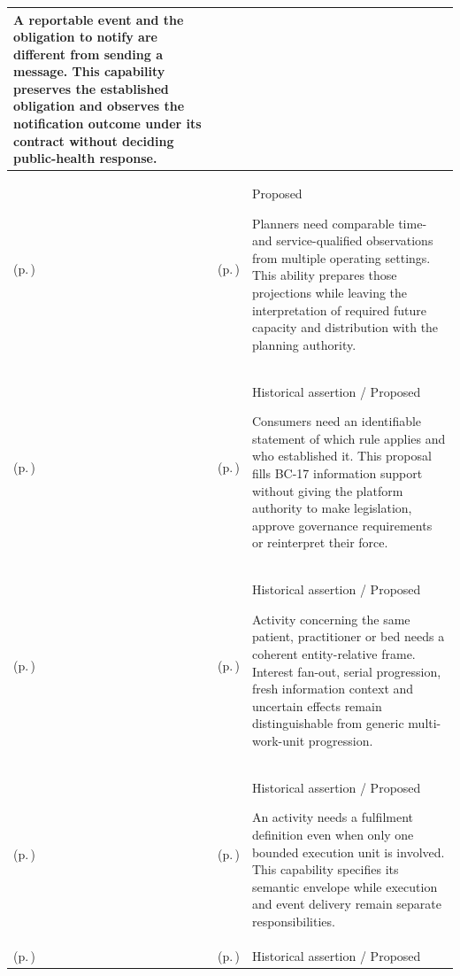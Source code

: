 \begin{longtable}{|>{\raggedright\arraybackslash}p{0.27\TableWidth}|>{\raggedright\arraybackslash}p{0.27\TableWidth}|>{\raggedright\arraybackslash}p{0.46\TableWidth}|}
A reportable event and the obligation to notify are different from sending a message. This capability preserves the established obligation and observes the notification outcome under its contract without deciding public-health response.\\\hline
\nameref{cap:bec-secondary-health-information-use-enablement} (p.\,\pageref{cap:bec-secondary-health-information-use-enablement}) & \nameref{cap:bec-service-planning-information-provision} (p.\,\pageref{cap:bec-service-planning-information-provision}) & Proposed

Planners need comparable time- and service-qualified observations from multiple operating settings. This ability prepares those projections while leaving the interpretation of required future capacity and distribution with the planning authority.\\\hline
\nameref{cap:bec-information-protection-accountability-enablement} (p.\,\pageref{cap:bec-information-protection-accountability-enablement}) & \nameref{cap:bec-governance-requirement-publication-support} (p.\,\pageref{cap:bec-governance-requirement-publication-support}) & Historical assertion / Proposed

Consumers need an identifiable statement of which rule applies and who established it. This proposal fills BC-17 information support without giving the platform authority to make legislation, approve governance requirements or reinterpret their force.\\\hline
\nameref{cap:bec-operational-activity-temporal-enablement} (p.\,\pageref{cap:bec-operational-activity-temporal-enablement}) & \nameref{cap:bec-entity-specific-operational-coordination} (p.\,\pageref{cap:bec-entity-specific-operational-coordination}) & Historical assertion / Proposed

Activity concerning the same patient, practitioner or bed needs a coherent entity-relative frame. Interest fan-out, serial progression, fresh information context and uncertain effects remain distinguishable from generic multi-work-unit progression.\\\hline
\nameref{cap:bec-operational-activity-temporal-enablement} (p.\,\pageref{cap:bec-operational-activity-temporal-enablement}) & \nameref{cap:bec-governed-operational-activity-design} (p.\,\pageref{cap:bec-governed-operational-activity-design}) & Historical assertion / Proposed

An activity needs a fulfilment definition even when only one bounded execution unit is involved. This capability specifies its semantic envelope while execution and event delivery remain separate responsibilities.\\\hline
\nameref{cap:bec-care-resource-capacity-coordination} (p.\,\pageref{cap:bec-care-resource-capacity-coordination}) & \nameref{cap:bec-service-offering-readiness-coordination} (p.\,\pageref{cap:bec-service-offering-readiness-coordination}) & Historical assertion / Proposed


\end{longtable}
